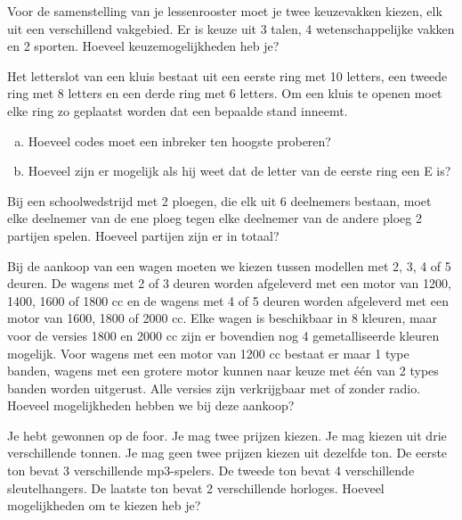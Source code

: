 \documentclass[12pt,a4paper,twoside]{article}
\begin{document}
\begin{oefening}
Voor de samenstelling van je lessenrooster moet je twee keuzevakken kiezen, elk uit een verschillend vakgebied. Er is keuze uit 3 talen, 4 wetenschappelijke vakken en 2 sporten. Hoeveel keuzemogelijkheden heb je?
\end{oefening}

\begin{oefening}
Het letterslot van een kluis bestaat uit een eerste ring met 10 letters, een tweede ring met 8 letters en een derde ring met 6 letters. Om een kluis te openen moet elke ring zo geplaatst worden dat een bepaalde stand inneemt.
\begin{enumerate}[(a)]
  \item Hoeveel codes moet een inbreker ten hoogste proberen?
  \item Hoeveel zijn er mogelijk als hij weet dat de letter van de eerste ring een E is?
\end{enumerate}
\end{oefening}

\begin{oefening}
Bij een schoolwedstrijd met 2 ploegen, die elk uit 6 deelnemers bestaan, moet elke deelnemer van de ene ploeg tegen elke deelnemer van de andere ploeg 2 partijen spelen. Hoeveel partijen zijn er in totaal?
\end{oefening}

\begin{oefening}
Bij de aankoop van een wagen moeten we kiezen tussen modellen met 2, 3, 4 of 5 deuren. De wagens met 2 of 3 deuren worden afgeleverd met een motor van 1200, 1400, 1600 of 1800 cc en de wagens met 4 of 5 deuren worden afgeleverd met een motor van 1600, 1800 of 2000 cc. Elke wagen is beschikbaar in 8 kleuren, maar voor de versies 1800 en 2000 cc zijn er bovendien nog 4 gemetalliseerde kleuren mogelijk. Voor wagens met een motor van 1200 cc bestaat er maar 1 type banden, wagens met een grotere motor kunnen naar keuze met één van 2 types banden worden uitgerust. Alle versies zijn verkrijgbaar met of zonder radio. Hoeveel mogelijkheden hebben we bij deze aankoop?
\end{oefening}

\begin{oefening}
Je hebt gewonnen op de foor. Je mag twee prijzen kiezen. Je mag kiezen uit drie verschillende tonnen. Je mag geen twee prijzen kiezen uit dezelfde ton. De eerste ton bevat 3 verschillende mp3-spelers. De tweede ton bevat 4 verschillende sleutelhangers. De laatste ton bevat 2 verschillende horloges. Hoeveel mogelijkheden om te kiezen heb je?
\end{oefening}
\end{document}
